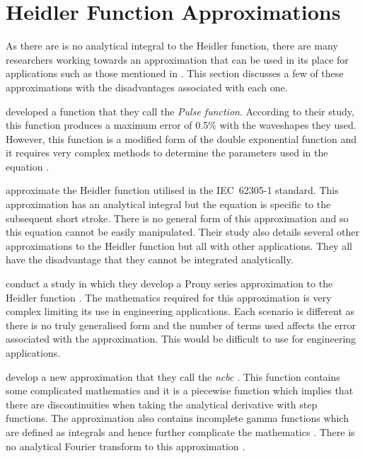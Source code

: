 
\section{Heidler Function Approximations}
\label{sec:background_approximations}
As there are is no analytical integral to the Heidler function, there are many researchers working towards an approximation that can be used in its place for applications such as those mentioned in . This section discusses a few of these approximations with the disadvantages associated with each one.

\citeauthor{ZhangFeizhouandLiuShanghe2002} developed a function that they call the \textit{Pulse function}. According to their study, this function produces a maximum error of 0.5\% with the waveshapes they used. However, this function is a modified form of the double exponential function and it requires very complex methods to determine the parameters used in the equation \cite{ZhangFeizhouandLiuShanghe2002}.

\citeauthor{Heidler2002} \cite{Heidler2002} approximate the Heidler function utilised in the IEC~62305-1 standard. This approximation has an analytical integral but the equation is specific to the subsequent short stroke. There is no general form of this approximation and so this equation cannot be easily manipulated. Their study also details several other approximations to the Heidler function but all with other applications. They all have the disadvantage that they cannot be integrated analytically.

\citeauthor{Delfino2012} conduct a study in which they develop a Prony series approximation to the Heidler function \cite{Delfino2012}. The mathematics required for this approximation is very complex limiting its use in engineering applications. Each scenario is different as there is no truly generalised form and the number of terms used affects the error associated with the approximation. This would be difficult to use for engineering applications.

\citeauthor{Javor2011} develop a new approximation that they call the \textit{\gls{ncbc}} \cite{Javor2011,Javor2012}. This function contains some complicated mathematics and it is a piecewise function which implies that there are discontinuities when taking the analytical derivative with step functions. The approximation also contains incomplete gamma functions which are defined as integrals and hence further complicate the mathematics \cite{Gautschi:1979:CPI}. There is no analytical Fourier transform to this approximation \cite{Javor}.


